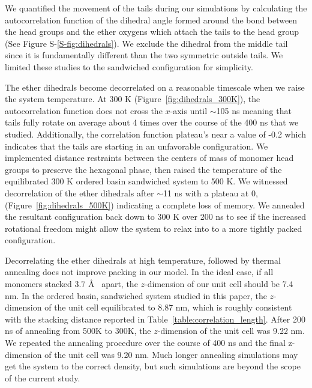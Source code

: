 \documentclass[journal=jpcbfk,manuscript=article]{achemso}
\begin{document}
  We quantified the movement of the tails during our simulations by calculating the 
  autocorrelation function of the dihedral angle formed around the bond between the 
  head groups and the ether oxygens which attach the tails to the head group 
  (See Figure S-\ref{S-fig:dihedrals}). We exclude the dihedral from the middle tail 
  since it is fundamentally different than the two symmetric outside tails. We 
  limited these studies to the sandwiched configuration for simplicity.
  
  The ether dihedrals become decorrelated on a reasonable timescale when we raise
  the system temperature. At 300 K (Figure~\ref{fig:dihedrals_300K}), the autocorrelation function does
  not cross the $x$-axis until $\sim$105 ns meaning that tails fully rotate on average about 
  4 times over the course of the 400 ns that we studied. Additionally, the correlation 
  function plateau's near a value of -0.2 which indicates that the tails are starting in 
  an unfavorable configuration. We implemented distance restraints between the centers of 
  mass of monomer head groups to preserve the hexagonal phase, then raised the temperature 
  of the equilibrated 300 K ordered basin sandwiched system to 500 K. We witnessed 
  decorrelation of the ether dihedrals after $\sim$11 ns with a plateau at 0, 
  (Figure~\ref{fig:dihedrals_500K}) indicating a complete loss of memory. We annealed
  the resultant configuration back down to 300 K over 200 ns to see if the increased rotational
  freedom might allow the system to relax into to a more tightly packed configuration.
  
  Decorrelating the ether dihedrals at high temperature, followed by thermal annealing
  does not improve packing in our model. In the ideal case, if all monomers stacked 
  3.7 \AA~ apart, the $z$-dimension of our unit cell should be 7.4 nm. In the ordered basin, 
  sandwiched system studied in this paper, the $z$-dimension of the unit cell equilibrated 
  to 8.87 nm, which is roughly consistent with the stacking distance reported in 
  Table~\ref{table:correlation_length}. After 200 ns of annealing from 500K to 300K, the 
  $z$-dimension of the unit cell was 9.22 nm. We repeated the annealing procedure over the 
  course of 400 ns and the final z-dimension of the unit cell was 9.20 nm. Much longer
  annealing simulations may get the system to the correct density, but such simulations are beyond
  the scope of the current study.
\end{document}
